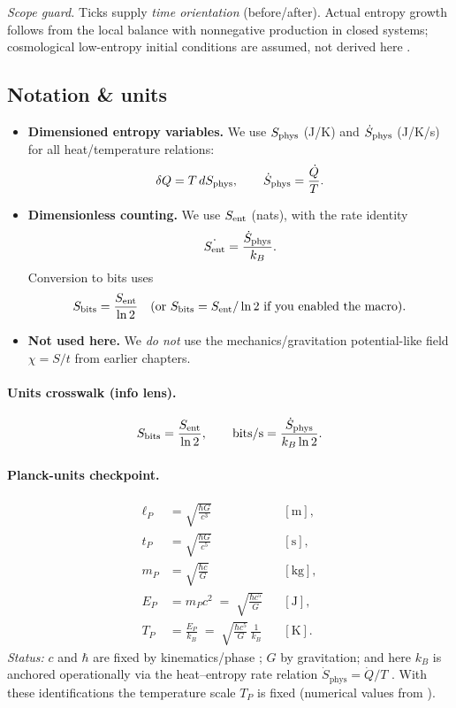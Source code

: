 \documentclass[11pt,oneside]{article}
\begin{document}
\emph{Scope guard.} Ticks supply \emph{time orientation} (before/after). Actual entropy growth follows from the local balance with nonnegative production in closed systems; cosmological low-entropy initial conditions are assumed, not derived here \cite{zeh2007arrow}.

\newcommand{\Sbits}{S_{\mathrm{bits}}}

\subsection*{Notation \& units}
\begin{itemize}
  \item \textbf{Dimensioned entropy variables.}
  We use \(S_{\mathrm{phys}}\) (J/K) and \(\dot{S}_{\mathrm{phys}}\) (J/K/s) for all heat/temperature relations:
  \[
    \delta Q = T\,dS_{\mathrm{phys}}, \qquad \dot{S}_{\mathrm{phys}} = \frac{\dot Q}{T}.
  \]

  \item \textbf{Dimensionless counting.}
  We use \(S_{\mathrm{ent}}\) (nats), with the rate identity
  \[
    \dot{S_{\mathrm{ent}}} = \frac{\dot{S}_{\mathrm{phys}}}{k_B}.
  \]
  Conversion to bits uses
  \[
    S_{\text{bits}} = \frac{\Sent}{\ln 2}
    \quad\text{(or }\Sbits = \Sent/\ln 2\text{ if you enabled the macro).}
  \]

  \item \textbf{Not used here.}
  We \emph{do not} use the mechanics/gravitation potential-like field \(\chi = S/t\) from earlier chapters.
\end{itemize}


\paragraph{Units crosswalk (info lens).}
\[
  S_{\text{bits}} = \frac{S_{\mathrm{ent}}}{\ln 2},
  \qquad
  \text{bits/s} = \frac{\dot{S}_{\mathrm{phys}}}{k_B \ln 2}.
\]

\paragraph{Planck-units checkpoint.}
\[
\begin{aligned}
\ell_P &= \sqrt{\frac{\hbar G}{c^{3}}} && [\mathrm{m}],\\
t_P    &= \sqrt{\frac{\hbar G}{c^{5}}} && [\mathrm{s}],\\
m_P    &= \sqrt{\frac{\hbar c}{G}}     && [\mathrm{kg}],\\
E_P    &= m_P c^{2}
        \;=\; \sqrt{\frac{\hbar c^{5}}{G}} && [\mathrm{J}],\\
T_P    &= \frac{E_P}{k_B}
        \;=\; \sqrt{\frac{\hbar c^{5}}{G}}\,\frac{1}{k_B} && [\mathrm{K}].
\end{aligned}
\]
\noindent\textit{Status:}
\(c\) and \(\hbar\) are fixed by kinematics/phase \cite{einstein1905elektrodynamik};
\(G\) by gravitation; and here \(k_B\) is anchored operationally via the heat–entropy
rate relation \(\dot S_{\mathrm{phys}}=\dot Q/T\) \cite{callen1985thermodynamics}.
With these identifications the temperature scale \(T_P\) is fixed (numerical values from
\cite{codata2018}).
\end{document}
